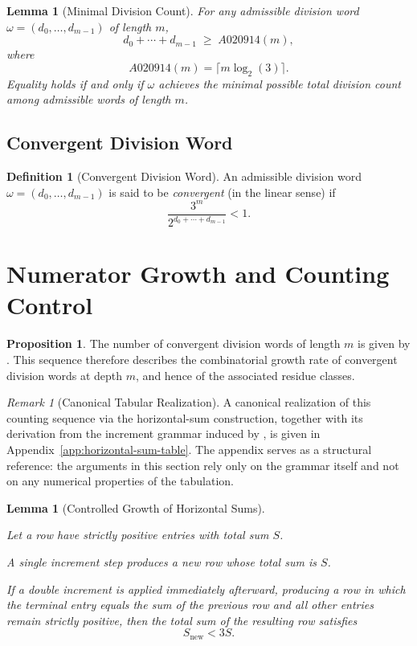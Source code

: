 \documentclass[12pt, oneside]{article}
\numberwithin{equation}{section}
\theoremstyle{definition}
\newtheorem{definition}{Definition}[section]
\newtheorem{proposition}{Proposition}[section]
\theoremstyle{plain}
\newtheorem{lemma}[theorem]{Lemma}
\theoremstyle{remark}
\newtheorem*{remark}{Remark}
\begin{document}
\begin{lemma}[Minimal Division Count]
For any admissible division word $\omega=(d_0,\dots,d_{m-1})$ of length $m$,
\[
d_0 + \cdots + d_{m-1} \;\ge\; A020914(m),
\]
where
\[
A020914(m) = \lceil m \log_2(3) \rceil.
\]
Equality holds if and only if $\omega$ achieves the minimal possible total
division count among admissible words of length $m$.
\end{lemma}

\subsection{Convergent Division Word}

\begin{definition}[Convergent Division Word]
An admissible division word $\omega = (d_0,\dots,d_{m-1})$ is said to be
\emph{convergent} (in the linear sense) if
\[
\frac{3^m}{2^{d_0+\cdots+d_{m-1}}} < 1.
\]
\end{definition}

\section{Numerator Growth and Counting Control}

\begin{proposition}
The number of convergent division words of length $m$ is given by .
This sequence therefore describes the combinatorial growth rate of convergent
division words at depth $m$, and hence of the associated residue classes.
\end{proposition}

\begin{remark}[Canonical Tabular Realization]
A canonical realization of this counting sequence via the horizontal-sum construction,
together with its derivation from the increment grammar induced by , is given
in Appendix~\ref{app:horizontal-sum-table}. The appendix serves as a structural reference:
the arguments in this section rely only on the grammar itself and not on any numerical
properties of the tabulation.
\end{remark}

\begin{lemma}[Controlled Growth of Horizontal Sums]
\label{lem:controlled-horizontal-growth}

Let a row have strictly positive entries with total sum $S$.

A single increment step produces a new row whose total sum is $S$.

If a double increment is applied immediately afterward, producing a row in which
the terminal entry equals the sum of the previous row and all other entries remain
strictly positive, then the total sum of the resulting row satisfies
\[
S_{\mathrm{new}} < 3S.
\]
\end{lemma}
\end{document}
